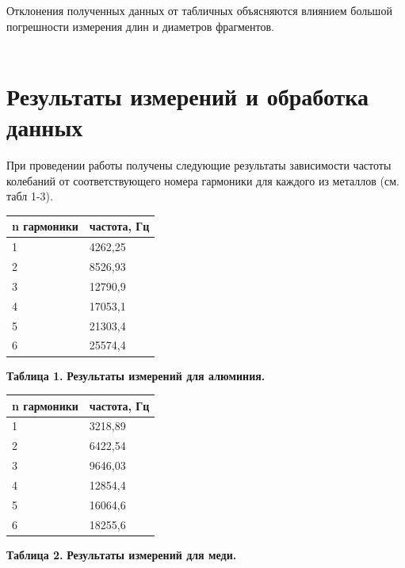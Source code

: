     Отклонения полученных данных от табличных объясняются влиянием большой погрешности измерения длин и диаметров фрагментов. \\\\
    
    

\section{Результаты измерений и обработка данных}

    При проведении работы получены следующие результаты зависимости частоты колебаний от соответствующего номера гармоники для каждого из металлов (см. табл 1-3).
    
     
    
\begin{table}[h!]
\centering
\begin{tabular}{|l|l|}
\hline
n гармоники & частота, Гц \\ \hline
1           & 4262,25     \\ \hline
2           & 8526,93     \\ \hline
3           & 12790,9     \\ \hline
4           & 17053,1     \\ \hline
5           & 21303,4     \\ \hline
6           & 25574,4     \\ \hline
\end{tabular}
\begin{flushright}
{\scriptsize \textbf{Таблица 1.} \textbf {Результаты измерений для алюминия.}}
\end{flushright}
\end{table}



\begin{table}[h!]
\centering
\begin{tabular}{|l|l|}
\hline
n гармоники & частота, Гц \\ \hline
1           & 3218,89     \\ \hline
2           & 6422,54     \\ \hline
3           & 9646,03     \\ \hline
4           & 12854,4     \\ \hline
5           & 16064,6     \\ \hline
6           & 18255,6     \\ \hline
\end{tabular}
\begin{flushright}
{\scriptsize \textbf{Таблица 2.} \textbf {Результаты измерений для меди.}}
\end{flushright}   
\end{table}


